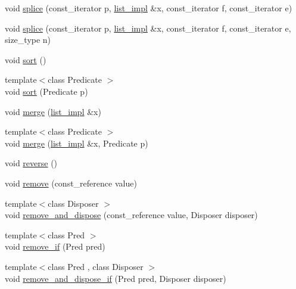 \begin{DoxyCompactItemize}
\item 
void \hyperlink{classboost_1_1intrusive_1_1list__impl_aca408f75788b574272d29392aebef9a5}{splice} (const\+\_\+iterator p, \hyperlink{classboost_1_1intrusive_1_1list__impl}{list\+\_\+impl} \&x, const\+\_\+iterator f, const\+\_\+iterator e)
\item 
void \hyperlink{classboost_1_1intrusive_1_1list__impl_a561eb714c3b33ed907e4a0aaed234592}{splice} (const\+\_\+iterator p, \hyperlink{classboost_1_1intrusive_1_1list__impl}{list\+\_\+impl} \&x, const\+\_\+iterator f, const\+\_\+iterator e, size\+\_\+type n)
\item 
void \hyperlink{classboost_1_1intrusive_1_1list__impl_abc510cb71270fe4ee9e5f8c7ba8e3aa0}{sort} ()
\item 
{\footnotesize template$<$class Predicate $>$ }\\void \hyperlink{classboost_1_1intrusive_1_1list__impl_a76891ada0d200ee89011b08ce5d548c0}{sort} (Predicate p)
\item 
void \hyperlink{classboost_1_1intrusive_1_1list__impl_abb9a2b93c0b84ec5dbf23df2c3ff3dcf}{merge} (\hyperlink{classboost_1_1intrusive_1_1list__impl}{list\+\_\+impl} \&x)
\item 
{\footnotesize template$<$class Predicate $>$ }\\void \hyperlink{classboost_1_1intrusive_1_1list__impl_acae4748c2c7891009cafd2b2a1adc057}{merge} (\hyperlink{classboost_1_1intrusive_1_1list__impl}{list\+\_\+impl} \&x, Predicate p)
\item 
void \hyperlink{classboost_1_1intrusive_1_1list__impl_a09ad4e2d3e2561d0cfe1be3ab7601b9c}{reverse} ()
\item 
void \hyperlink{classboost_1_1intrusive_1_1list__impl_a67b3e202dc68b3de5643c2abf40847f7}{remove} (const\+\_\+reference value)
\item 
{\footnotesize template$<$class Disposer $>$ }\\void \hyperlink{classboost_1_1intrusive_1_1list__impl_ab52f7ab80a51b6364f950a3e7521018b}{remove\+\_\+and\+\_\+dispose} (const\+\_\+reference value, Disposer disposer)
\item 
{\footnotesize template$<$class Pred $>$ }\\void \hyperlink{classboost_1_1intrusive_1_1list__impl_ab74f15b0c56ff811322551eb7090be2d}{remove\+\_\+if} (Pred pred)
\item 
{\footnotesize template$<$class Pred , class Disposer $>$ }\\void \hyperlink{classboost_1_1intrusive_1_1list__impl_afb94638a081eb6fed0bf005b04cf9f88}{remove\+\_\+and\+\_\+dispose\+\_\+if} (Pred pred, Disposer disposer)

\end{DoxyCompactItemize}
